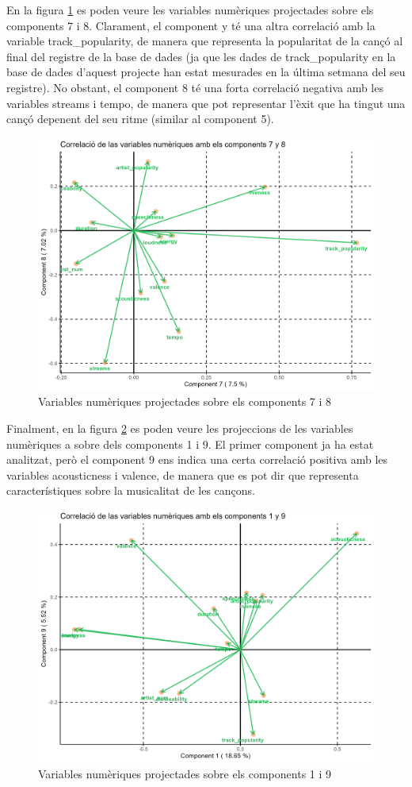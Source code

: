 En la figura \ref{fig:6_FM:ACP_C78} es poden veure les variables numèriques projectades sobre els components 7 i 8. Clarament, el component y té una altra correlació amb la variable track\_popularity, de manera que representa la popularitat de la cançó al final del registre de la base de dades (ja que les dades de track\_popularity en la base de dades d'aquest projecte han estat mesurades en la última setmana del seu registre). No obstant, el component 8 té una forta correlació negativa amb les variables streams i tempo, de manera que pot representar l'èxit que ha tingut una cançó depenent del seu ritme (similar al component 5).

\begin{figure}[H]
    \centering
    \includegraphics[width=0.8\linewidth]{Images/6_Factorial_Methods/ACP/Num_C7_C8.png}
    \caption{Variables numèriques projectades sobre els components 7 i 8}
    \label{fig:6_FM:ACP_C78}
\end{figure}

Finalment, en la figura \ref{fig:6_FM:ACP_C19} es poden veure les projeccions de les variables numèriques a sobre dels components 1 i 9. El primer component ja ha estat analitzat, però el component 9 ens indica una certa correlació positiva amb les variables acousticness i valence, de manera que es pot dir que representa característiques sobre la musicalitat de les cançons.

\begin{figure}[H]
    \centering
    \includegraphics[width=0.8\linewidth]{Images/6_Factorial_Methods/ACP/Num_C1_C9.png}
    \caption{Variables numèriques projectades sobre els components 1 i 9}
    \label{fig:6_FM:ACP_C19}
\end{figure}


